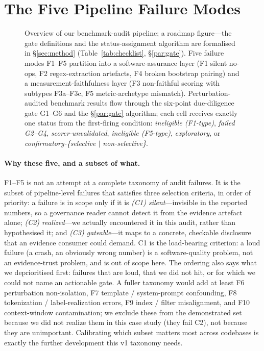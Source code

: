 \section{The Five Pipeline Failure Modes}
\label{sec:taxonomy}

\begin{figure}[t]
    \centering
    
    \caption{Overview of our benchmark-audit pipeline; a roadmap
    figure---the gate definitions and the status-assignment
    algorithm are formalised in \S\ref{sec:method} (Table~\ref{tab:checklist},
    \S\ref{par:gate}). Five failure modes F1--F5 partition into a
    software-assurance layer (F1 silent no-ops, F2 regex-extraction
    artefacts, F4 broken bootstrap pairing) and a
    measurement-faithfulness layer (F3 non-faithful scoring with
    subtypes F3a--F3c, F5 metric-archetype mismatch).
    Perturbation-audited benchmark results flow through the six-point
    due-diligence gate G1--G6 and the \S\ref{par:gate} algorithm;
    each cell receives exactly one status from the first-firing
    condition: \emph{ineligible (F1-type)}, \emph{failed G2--G4},
    \emph{scorer-unvalidated}, \emph{ineligible (F5-type)},
    \emph{exploratory}, or \emph{confirmatory-\{selective $\vert$
    non-selective\}}.}
    \label{fig:pipeline}
\end{figure}

\paragraph{Why these five, and a subset of what.}
F1--F5 is not an attempt at a complete taxonomy of audit failures.
It is the subset of pipeline-level failures that satisfies three
selection criteria, in order of priority: a failure is in scope
only if it is \emph{(C1) silent}---invisible in the reported numbers,
so a governance reader cannot detect it from the evidence artefact
alone; \emph{(C2) realized}---we actually encountered it in this
audit, rather than hypothesised it; and \emph{(C3) gateable}---it
maps to a concrete, checkable disclosure that an evidence consumer
could demand. C1 is the load-bearing criterion: a loud failure
(a crash, an obviously wrong number) is a software-quality problem,
not an evidence-trust problem, and is out of scope here. The
ordering also says what we deprioritised first: failures that are
loud, that we did not hit, or for which we could not name an
actionable gate. A fuller taxonomy would add at least F6
perturbation non-isolation, F7 template / system-prompt
confounding, F8 tokenization / label-realization errors, F9 index /
filter misalignment, and F10 context-window contamination; we
exclude these from the demonstrated set because we did not realize
them in this case study (they fail C2), not because they are
unimportant. Calibrating which subset matters most across
codebases is exactly the further development this v1 taxonomy
needs.

